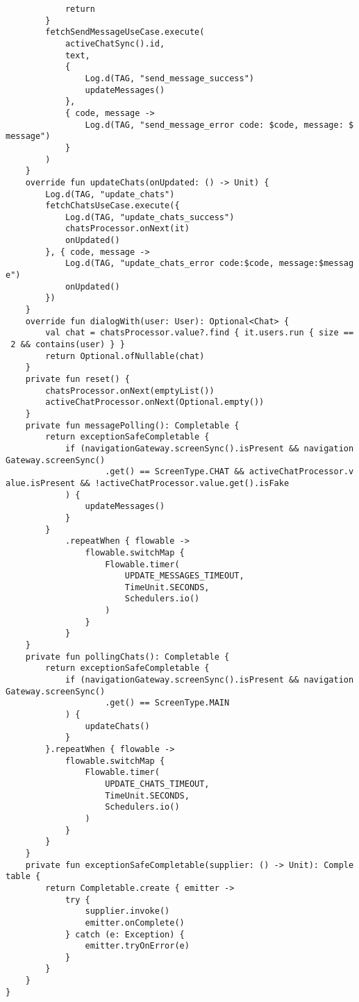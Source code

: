 \documentclass[listing]{espd}
\begin{document}
\begin{verbatim}
            return
        }
        fetchSendMessageUseCase.execute(
            activeChatSync().id,
            text,
            {
                Log.d(TAG, "send_message_success")
                updateMessages()
            },
            { code, message ->
                Log.d(TAG, "send_message_error code: $code, message: $
message")
            }
        )
    }
    override fun updateChats(onUpdated: () -> Unit) {
        Log.d(TAG, "update_chats")
        fetchChatsUseCase.execute({
            Log.d(TAG, "update_chats_success")
            chatsProcessor.onNext(it)
            onUpdated()
        }, { code, message ->
            Log.d(TAG, "update_chats_error code:$code, message:$messag
e")
            onUpdated()
        })
    }
    override fun dialogWith(user: User): Optional<Chat> {
        val chat = chatsProcessor.value?.find { it.users.run { size ==
 2 && contains(user) } }
        return Optional.ofNullable(chat)
    }
    private fun reset() {
        chatsProcessor.onNext(emptyList())
        activeChatProcessor.onNext(Optional.empty())
    }
    private fun messagePolling(): Completable {
        return exceptionSafeCompletable {
            if (navigationGateway.screenSync().isPresent && navigation
Gateway.screenSync()
                    .get() == ScreenType.CHAT && activeChatProcessor.v
alue.isPresent && !activeChatProcessor.value.get().isFake
            ) {
                updateMessages()
            }
        }
            .repeatWhen { flowable ->
                flowable.switchMap {
                    Flowable.timer(
                        UPDATE_MESSAGES_TIMEOUT,
                        TimeUnit.SECONDS,
                        Schedulers.io()
                    )
                }
            }
    }
    private fun pollingChats(): Completable {
        return exceptionSafeCompletable {
            if (navigationGateway.screenSync().isPresent && navigation
Gateway.screenSync()
                    .get() == ScreenType.MAIN
            ) {
                updateChats()
            }
        }.repeatWhen { flowable ->
            flowable.switchMap {
                Flowable.timer(
                    UPDATE_CHATS_TIMEOUT,
                    TimeUnit.SECONDS,
                    Schedulers.io()
                )
            }
        }
    }
    private fun exceptionSafeCompletable(supplier: () -> Unit): Comple
table {
        return Completable.create { emitter ->
            try {
                supplier.invoke()
                emitter.onComplete()
            } catch (e: Exception) {
                emitter.tryOnError(e)
            }
        }
    }
}
\end{verbatim}
\end{document}
